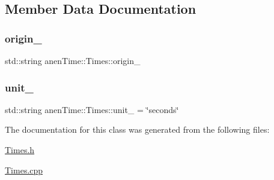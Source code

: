 \subsection{Member Data Documentation}
\mbox{\label{classanen_time_1_1_times_a7e08602fb0628df1c5f1cccbb98baeb1}} 
\subsubsection{\texorpdfstring{origin\+\_\+}{origin\_}}
{\footnotesize\ttfamily std\+::string anen\+Time\+::\+Times\+::origin\+\_\+\hspace{0.3cm}{\ttfamily [protected]}}

\mbox{\label{classanen_time_1_1_times_a1bc1f74d961af9efa6462b2cbe5f3718}} 
\subsubsection{\texorpdfstring{unit\+\_\+}{unit\_}}
{\footnotesize\ttfamily std\+::string anen\+Time\+::\+Times\+::unit\+\_\+ = \char`\"{}seconds\char`\"{}\hspace{0.3cm}{\ttfamily [protected]}}



The documentation for this class was generated from the following files\+:\begin{DoxyCompactItemize}
\item 
\mbox{\hyperlink{_times_8h}{Times.\+h}}\item 
\mbox{\hyperlink{_times_8cpp}{Times.\+cpp}}\end{DoxyCompactItemize}
